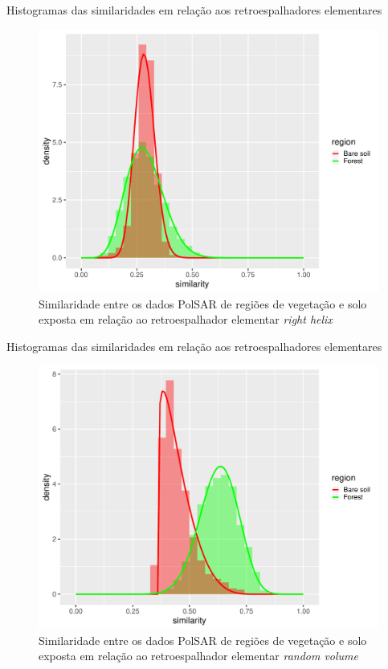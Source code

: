 \documentclass{beamer} %
\begin{document}
\begin{frame}{Histogramas das similaridades em relação aos retroespalhadores elementares}

\begin{figure}
    \centering
    \includegraphics[width = .6\linewidth]{rh.pdf}
    \caption{Similaridade entre os dados PolSAR de regiões de vegetação e solo exposta em relação ao retroespalhador elementar \textit{right helix}}
    \label{fig:rh}
\end{figure}
    
\end{frame}

\begin{frame}{Histogramas das similaridades em relação aos retroespalhadores elementares}

\begin{figure}
    \centering
    \includegraphics[width = .6\linewidth]{rv.pdf}
    \caption{Similaridade entre os dados PolSAR de regiões de vegetação e solo exposta em relação ao retroespalhador elementar \textit{random volume}}
    \label{fig:rv}
\end{figure}
    
\end{frame}
\end{document}
